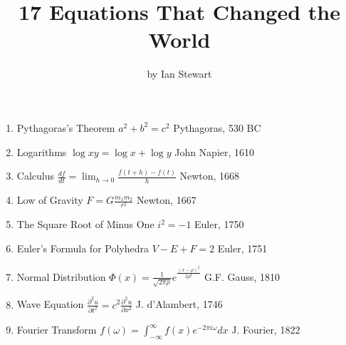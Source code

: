 \documentclass{article}
\date{}
\begin{document}
\title{17 Equations That Changed the World}
\author{by Ian Stewart}
\maketitle

\begin{enumerate}
\item  \begin{minipage}[t]{100mm} Pythagoras's Theorem $a^2+b^2 = c^2$ \hfill Pythagoras, 530 BC \end{minipage} 
 \item \begin{minipage}[t]{100mm} Logarithms $\log xy = \log x + \log y$    \hfill  John Napier, 1610 \end{minipage} 
\item   \begin{minipage}[t]{100mm} Calculus $\frac{df}{dt} =\lim_{h\to 0} \frac{f(t+h)-f(t)}{h}$  \hfill  Newton, 1668 \end{minipage} 
\item \begin{minipage}[t]{100mm} Low of Gravity $F = G\frac{m_1m_2}{r^2}$ \hfill  Newton, 1667 \end{minipage} 
\item \begin{minipage}[t]{100mm} The Square Root of Minus One $i^2 = -1$   \hfill Euler, 1750 \end{minipage} 
\item \begin{minipage}[t]{100mm} Euler's Formula for Polyhedra $V - E + F = 2$ \hfill Euler, 1751 \end{minipage} 
\item \begin{minipage}[t]{100mm} 
Normal Distribution $\Phi \left(x\right) = \frac{1}{\sqrt{2\pi \rho}} {e}^{\frac{(x - \rho)^{2}}{2\rho^{2}}} $  \hfill G.F. Gauss, 1810 \end{minipage} 
\item \begin{minipage}[t]{100mm} Wave Equation $ \frac{\partial^{2}u}{\partial t^{2}} = c^{2}\frac{\partial^{2}u}{\partial x^{2}} $
\hfill J. d'Alambert, 1746 \end{minipage}
\item \begin{minipage}[t]{100mm} Fourier Transform $ f(\omega) = {\int_{-\infty}^{\infty}} f\left(x \right) {e}^{-2\pi i \omega} dx $ \hfill J. Fourier, 1822 \end{minipage}

\end{enumerate}
\end{document}
